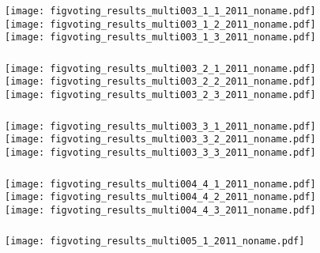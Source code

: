 \begin{frame}
  \frametitle{}

  \texttt{[image: figvoting\_results\_multi003\_1\_1\_2011\_noname.pdf]}\\
  \texttt{[image: figvoting\_results\_multi003\_1\_2\_2011\_noname.pdf]}\\
  \texttt{[image: figvoting\_results\_multi003\_1\_3\_2011\_noname.pdf]}

\end{frame}

\begin{frame}
  \frametitle{}

  \texttt{[image: figvoting\_results\_multi003\_2\_1\_2011\_noname.pdf]}\\
  \texttt{[image: figvoting\_results\_multi003\_2\_2\_2011\_noname.pdf]}\\
  \texttt{[image: figvoting\_results\_multi003\_2\_3\_2011\_noname.pdf]}

\end{frame}

\begin{frame}
  \frametitle{}

  \texttt{[image: figvoting\_results\_multi003\_3\_1\_2011\_noname.pdf]}\\
  \texttt{[image: figvoting\_results\_multi003\_3\_2\_2011\_noname.pdf]}\\
  \texttt{[image: figvoting\_results\_multi003\_3\_3\_2011\_noname.pdf]}

\end{frame}

\begin{frame}
  \frametitle{}

  \texttt{[image: figvoting\_results\_multi004\_4\_1\_2011\_noname.pdf]}\\
  \texttt{[image: figvoting\_results\_multi004\_4\_2\_2011\_noname.pdf]}\\
  \texttt{[image: figvoting\_results\_multi004\_4\_3\_2011\_noname.pdf]}

\end{frame}

\begin{frame}[plain]
  \frametitle{}

  \texttt{[image: figvoting\_results\_multi005\_1\_2011\_noname.pdf]}

\end{frame}

